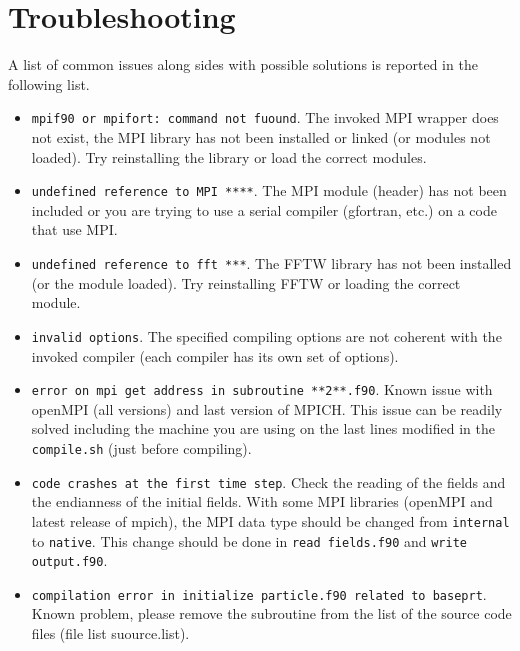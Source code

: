 \section{Troubleshooting}

A list of common issues along sides with possible solutions is reported in the following list.
\begin{itemize}
\item \texttt{mpif90 or mpifort: command not fuound}. The invoked MPI wrapper does not exist, the MPI library has not been installed or linked (or modules not loaded). Try reinstalling the library or load the correct modules. 
\item \texttt{undefined reference to MPI ****}. The MPI module (header) has not been included or you are trying to use a serial compiler (gfortran, etc.) on a code that use MPI.
\item \texttt{undefined reference to fft ***}. The FFTW library has not been installed (or the module loaded). Try reinstalling FFTW or loading the correct module.
\item \texttt{invalid options}. The specified compiling options are not coherent with the invoked compiler (each compiler has its own set of options).
\item \texttt{error on mpi get address in subroutine **2**.f90}. Known issue with openMPI (all versions) and last version of MPICH. This issue can be readily solved including the machine you are using on the last lines modified in the \texttt{compile.sh} (just before compiling).
\item \texttt{code crashes at the first time step}. Check the reading of the fields and the endianness of the initial fields. With some MPI libraries (openMPI and latest release of mpich), the MPI data type should be changed from \texttt{internal} to \texttt{native}. This change should be done in \texttt{read fields.f90} and \texttt{write output.f90}.
\item \texttt{compilation error in initialize particle.f90 related to baseprt}. Known problem, please remove the subroutine from the list of the source code files (file list suource.list).
\end{itemize}



